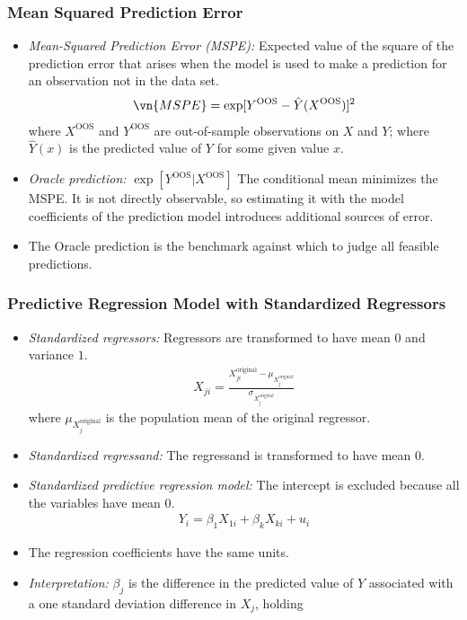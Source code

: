 \begin{frame}
\frametitle{Mean Squared Prediction Error}
\begin{itemize}
\item \emph{Mean-Squared Prediction Error (MSPE):}
Expected value of the square of the prediction error that arises when the model is used to make a prediction for an observation not in the data set.
\begin{align*}
\vn{MSPE} = \exp[Y^{\text{OOS}} - \hat{Y}(X^{\text{OOS}})]^{2}
\end{align*}
where $X^{\text{OOS}}$ and $Y^{\text{OOS}}$ are out-of-sample observations on $X$ and $Y$; where $\hat{Y}(x)$ is the predicted value of $Y$ for some given value $x$. 
\item \emph{Oracle prediction:}
$\exp[Y^{\text{OOS}}|X^{\text{OOS}}]$ 
The conditional mean minimizes the MSPE. It is not directly observable, so estimating it with the model coefficients of the prediction model introduces additional sources of error.
\item The Oracle prediction is the benchmark against which to judge all feasible predictions. 
\end{itemize}
\end{frame}


\begin{frame}
\frametitle{Predictive Regression Model with Standardized Regressors}
\begin{itemize}
\item \emph{Standardized regressors:}
Regressors are transformed to have mean $0$ and variance $1$.
\begin{align*}
X_{ji} = \frac{X_{ji}^{\text{original}}-\mu_{X_{j}^{\text{original}}}}{\sigma_{X_{j}^{\text{original}}}}
\end{align*}
where $\mu_{X_{j}^{\text{original}}}$ is the population mean of the original regressor. 
\item \emph{Standardized regressand:}
The regressand is transformed to have mean $0$. 
\item \emph{Standardized predictive regression model:}
The intercept is excluded because all the variables have mean $0$.
\begin{align*}
Y_{i} = \beta_{1} X_{1i} + \beta_{k} X_{ki} + u_{i}
\end{align*}
\item The regression coefficients have the same units. 
\item \emph{Interpretation:}
$\beta_{j}$ is the difference in the predicted value of $Y$ associated with a one standard deviation difference in $X_{j}$, holding 
\end{itemize}
\end{frame}


